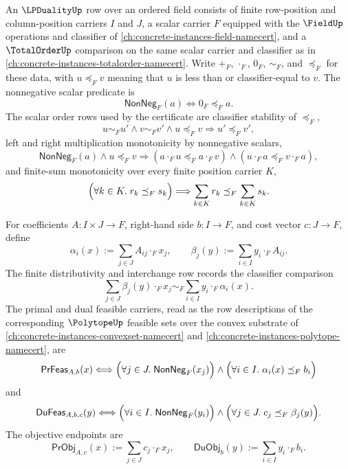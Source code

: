 \begin{definition}
\label{def:lpduality-finite-ordered-field-feasibility-row}
An $\LPDualityUp$ row over an ordered field consists of finite row-position and column-position carriers $I$ and $J$, a scalar carrier $F$ equipped with the $\FieldUp$ operations and classifier of \autoref{ch:concrete-instances-field-namecert}, and a $\TotalOrderUp$ comparison on the same scalar carrier and classifier as in \autoref{ch:concrete-instances-totalorder-namecert}. Write $+_F$, $\cdot_F$, $0_F$, $\sim_F$, and $\preceq_F$ for these data, with $u\preceq_F v$ meaning that $u$ is less than or classifier-equal to $v$. The nonnegative scalar predicate is
$$
\mathsf{NonNeg}_F(a)\Longleftrightarrow 0_F\preceq_F a.
$$
The scalar order rows used by the certificate are classifier stability of $\preceq_F$,
$$
u\sim_Fu'\land v\sim_Fv'\land u\preceq_Fv
\Longrightarrow u'\preceq_Fv',
$$
left and right multiplication monotonicity by nonnegative scalars,
$$
\mathsf{NonNeg}_F(a)\land u\preceq_Fv
\Longrightarrow
(a\cdot_Fu\preceq_Fa\cdot_Fv)
\land
(u\cdot_Fa\preceq_Fv\cdot_Fa),
$$
and finite-sum monotonicity over every finite position carrier $K$,
$$
\Bigl(\forall k\in K.\; r_k\preceq_Fs_k\Bigr)
\Longrightarrow
\sum_{k\in K}r_k\preceq_F\sum_{k\in K}s_k.
$$

For coefficients $A:I\times J\to F$, right-hand side $b:I\to F$, and cost vector $c:J\to F$, define
$$
\alpha_i(x):=\sum_{j\in J} A_{ij}\cdot_F x_j,
\qquad
\beta_j(y):=\sum_{i\in I} y_i\cdot_F A_{ij}.
$$
The finite distributivity and interchange row records the classifier comparison
$$
\sum_{j\in J}\beta_j(y)\cdot_Fx_j
\sim_F
\sum_{i\in I}y_i\cdot_F\alpha_i(x).
$$
The primal and dual feasible carriers, read as the row descriptions of the corresponding $\PolytopeUp$ feasible sets over the convex substrate of \autoref{ch:concrete-instances-convexset-namecert} and \autoref{ch:concrete-instances-polytope-namecert}, are
$$
\mathsf{PrFeas}_{A,b}(x)\Longleftrightarrow
\Bigl(\forall j\in J.\;\mathsf{NonNeg}_F(x_j)\Bigr)
\land
\Bigl(\forall i\in I.\;\alpha_i(x)\preceq_F b_i\Bigr)
$$
and
$$
\mathsf{DuFeas}_{A,b,c}(y)\Longleftrightarrow
\Bigl(\forall i\in I.\;\mathsf{NonNeg}_F(y_i)\Bigr)
\land
\Bigl(\forall j\in J.\;c_j\preceq_F\beta_j(y)\Bigr).
$$
The objective endpoints are
$$
\mathsf{PrObj}_{A,c}(x):=\sum_{j\in J} c_j\cdot_Fx_j,
\qquad
\mathsf{DuObj}_{b}(y):=\sum_{i\in I} y_i\cdot_Fb_i.
$$
\end{definition}

